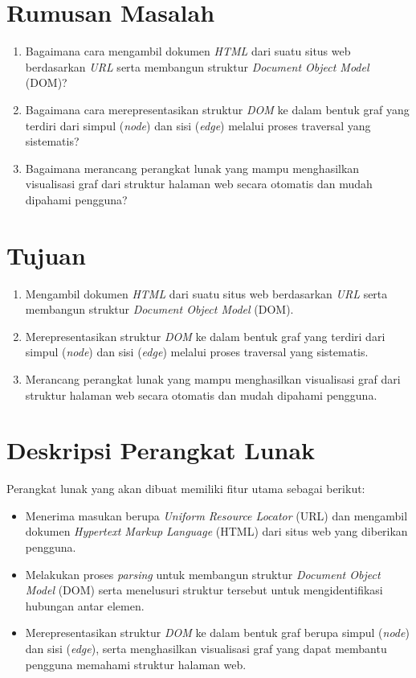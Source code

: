 \documentclass[a4paper,twoside]{article}
\begin{document}
	\section{Rumusan Masalah}
	\begin{enumerate}
        \item Bagaimana cara mengambil dokumen \textit{HTML} dari suatu situs web berdasarkan \textit{URL} serta membangun struktur \textit{Document Object Model} (DOM)?
        
        \item Bagaimana cara merepresentasikan struktur \textit{DOM} ke dalam bentuk graf yang terdiri dari simpul (\textit{node}) dan sisi (\textit{edge}) melalui proses traversal yang sistematis?
        
        \item Bagaimana merancang perangkat lunak yang mampu menghasilkan visualisasi graf dari struktur halaman web secara otomatis dan mudah dipahami pengguna?
    \end{enumerate}
	
	\section{Tujuan}
	\begin{enumerate}
    \item Mengambil dokumen \textit{HTML} dari suatu situs web berdasarkan \textit{URL} serta membangun struktur \textit{Document Object Model} (DOM).
    
    \item Merepresentasikan struktur \textit{DOM} ke dalam bentuk graf yang terdiri dari simpul (\textit{node}) dan sisi (\textit{edge}) melalui proses traversal yang sistematis.
    
    \item Merancang perangkat lunak yang mampu menghasilkan visualisasi graf dari struktur halaman web secara otomatis dan mudah dipahami pengguna.
    \end{enumerate}
	
	\section{Deskripsi Perangkat Lunak}
	Perangkat lunak yang akan dibuat memiliki fitur utama sebagai berikut:
    \begin{itemize}
    \item Menerima masukan berupa \textit{Uniform Resource Locator} (URL) dan mengambil dokumen \textit{Hypertext Markup Language} (HTML) dari situs web yang diberikan pengguna.
    
    \item Melakukan proses \textit{parsing} untuk membangun struktur \textit{Document Object Model} (DOM) serta menelusuri struktur tersebut untuk mengidentifikasi hubungan antar elemen.
    
    \item Merepresentasikan struktur \textit{DOM} ke dalam bentuk graf berupa simpul (\textit{node}) dan sisi (\textit{edge}), serta menghasilkan visualisasi graf yang dapat membantu pengguna memahami struktur halaman web.
    \end{itemize}
	
\end{document}
